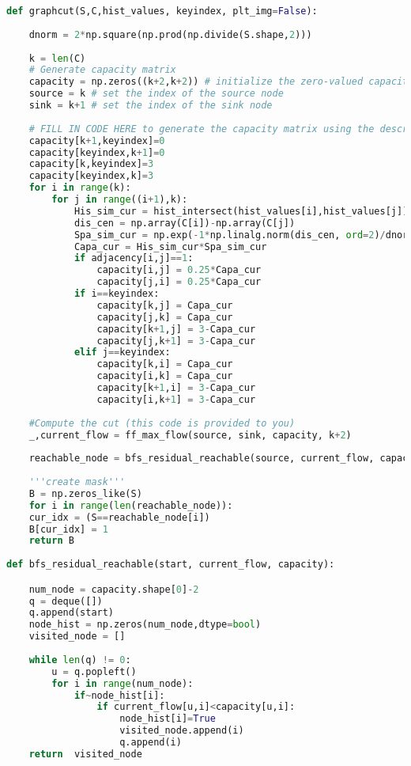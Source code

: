 \documentclass[12pt]{article}
\begin{document}
\begin{lstlisting}[language=Python]
def graphcut(S,C,hist_values, keyindex, plt_img=False):
	
	dnorm = 2*np.square(np.prod(np.divide(S.shape,2)))
	
	k = len(C)
	# Generate capacity matrix
	capacity = np.zeros((k+2,k+2)) # initialize the zero-valued capacity matrix
	source = k # set the index of the source node
	sink = k+1 # set the index of the sink node
	
	# FILL IN CODE HERE to generate the capacity matrix using the description above.
	capacity[k+1,keyindex]=0
	capacity[keyindex,k+1]=0
	capacity[k,keyindex]=3
	capacity[keyindex,k]=3
	for i in range(k):
		for j in range((i+1),k):
			His_sim_cur = hist_intersect(hist_values[i],hist_values[j])
			dis_cen = np.array(C[i])-np.array(C[j])
			Spa_sim_cur = np.exp(-1*np.linalg.norm(dis_cen, ord=2)/dnorm)
			Capa_cur = His_sim_cur*Spa_sim_cur
			if adjacency[i,j]==1:
				capacity[i,j] = 0.25*Capa_cur
				capacity[j,i] = 0.25*Capa_cur          
			if i==keyindex:
				capacity[k,j] = Capa_cur
				capacity[j,k] = Capa_cur
				capacity[k+1,j] = 3-Capa_cur
				capacity[j,k+1] = 3-Capa_cur
			elif j==keyindex:
				capacity[k,i] = Capa_cur
				capacity[i,k] = Capa_cur
				capacity[k+1,i] = 3-Capa_cur
				capacity[i,k+1] = 3-Capa_cur
		
	#Compute the cut (this code is provided to you)
	_,current_flow = ff_max_flow(source, sink, capacity, k+2)
	
	reachable_node = bfs_residual_reachable(source, current_flow, capacity)
	
	'''create mask'''
	B = np.zeros_like(S)
	for i in range(len(reachable_node)):
	cur_idx = (S==reachable_node[i])
	B[cur_idx] = 1
	return B
	
def bfs_residual_reachable(start, current_flow, capacity):

	num_node = capacity.shape[0]-2
	q = deque([])
	q.append(start)
	node_hist = np.zeros(num_node,dtype=bool)
	visited_node = []
	
	while len(q) != 0:
		u = q.popleft()
		for i in range(num_node):
			if~node_hist[i]:
				if current_flow[u,i]<capacity[u,i]:
					node_hist[i]=True
					visited_node.append(i)
					q.append(i) 
	return  visited_node  
\end{lstlisting}
\end{document}
